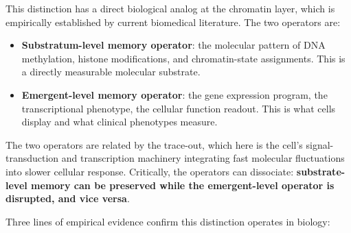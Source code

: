 \documentclass[
]{article}
\providecommand{\tightlist}{%
  \setlength{\itemsep}{0pt}\setlength{\parskip}{0pt}}
\begin{document}
This distinction has a direct biological analog at the chromatin layer,
which is empirically established by current biomedical literature. The
two operators are:

\begin{itemize}
\tightlist
\item
  \textbf{Substratum-level memory operator}: the molecular pattern of
  DNA methylation, histone modifications, and chromatin-state
  assignments. This is a directly measurable molecular substrate.
\item
  \textbf{Emergent-level memory operator}: the gene expression program,
  the transcriptional phenotype, the cellular function readout. This is
  what cells display and what clinical phenotypes measure.
\end{itemize}

The two operators are related by the trace-out, which here is the cell's
signal-transduction and transcription machinery integrating fast
molecular fluctuations into slower cellular response. Critically, the
operators can dissociate: \textbf{substrate-level memory can be
preserved while the emergent-level operator is disrupted, and vice
versa}.

Three lines of empirical evidence confirm this distinction operates in
biology:
\end{document}
